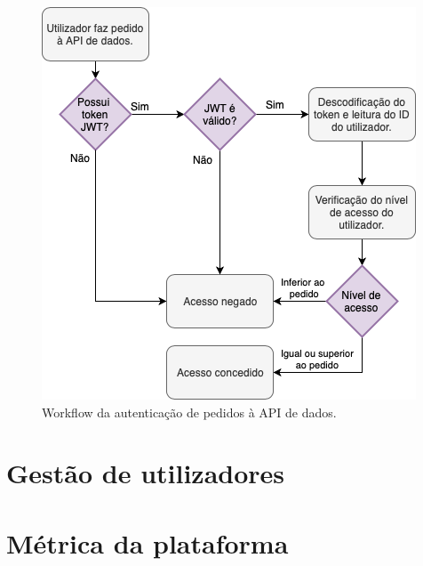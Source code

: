 \begin{figure}[h!]
    \centering
    \includegraphics[width=\textwidth]{img/diagramas/authAPI/AuthAPI.png}
    \caption{Workflow da autenticação de pedidos à API de dados.}
    \label{fig:flow_authCC}
\end{figure}

\cleardoublepage
\section{Gestão de utilizadores}

\cleardoublepage
\section{Métrica da plataforma}